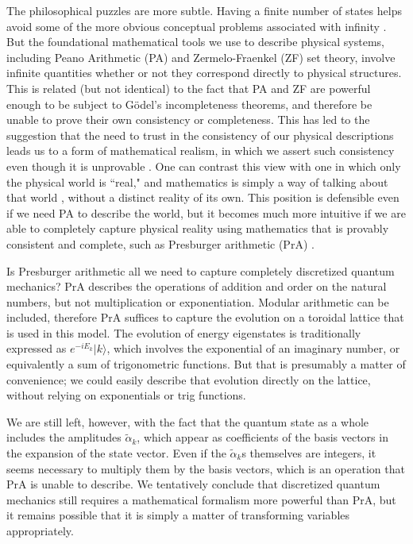\documentclass[aps,prd,twocolumn,nofootinbib,notitlepage]{revtex4-1}
\begin{document}
The philosophical puzzles are more subtle.
Having a finite number of states helps avoid some of the more obvious conceptual problems associated with infinity \cite{sep-infinity}.
But the foundational mathematical tools we use to describe physical systems, including Peano Arithmetic (PA) and Zermelo-Fraenkel (ZF)  set theory, involve infinite quantities whether or not they correspond directly to physical structures.
This is related (but not identical) to the fact that PA and ZF are powerful enough to be subject to G\"odel's incompleteness theorems, and therefore be unable to prove their own consistency or completeness.
This has led to the suggestion that the need to trust in the consistency of our physical descriptions leads us to a form of mathematical realism, in which we assert such consistency even though it is unprovable \cite{putnam1975mathematical}.
One can contrast this view with one in which only the physical world is ``real," and mathematics is simply a way of talking about that world \cite{CarrollManuscript-CARRRK}, without a distinct reality of its own.
This position is defensible even if we need PA to describe the world, but it becomes much more intuitive if we are able to completely capture physical reality using mathematics that is provably consistent and complete, such as Presburger arithmetic (PrA) \cite{presburger1929uber,haase}.

Is Presburger arithmetic all we need to capture completely discretized quantum mechanics?
PrA describes the operations of addition and order on the natural numbers, but not multiplication or exponentiation.
Modular arithmetic can be included, therefore PrA suffices to capture the evolution on a toroidal lattice that is used in this model.
The evolution of energy eigenstates is traditionally expressed as $e^{-iE_k}|k\rangle$, which involves the exponential of an imaginary number, or equivalently a sum of trigonometric functions.
But that is presumably a matter of convenience; we could easily describe that evolution directly on the lattice, without relying on exponentials or trig functions.

We are still left, however, with the fact that the quantum state as a whole includes the amplitudes $\tilde\alpha_k$, which appear as coefficients of the basis vectors in the expansion of the state vector.
Even if the $\tilde\alpha_k$s themselves are integers, it seems necessary to multiply them by the basis vectors, which is an operation that PrA is unable to describe.
We tentatively conclude that discretized quantum mechanics still requires a mathematical formalism more powerful than PrA, but it remains possible that it is simply a matter of transforming variables appropriately.
\end{document}
